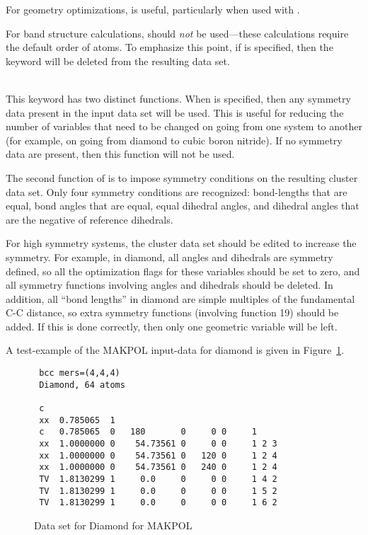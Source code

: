 \begin{description}
For geometry optimizations,  is useful, particularly when used with 
.  

For band structure calculations,  should {\em not} be used---these
calculations require the default order of atoms.  To emphasize this point, if
 is specified, then the keyword  will be deleted from the
resulting data set.

\item[\comp{SYMMETRY}]~\\ 
This keyword has two distinct functions.  When  is specified,
then any symmetry data present in the input data set will be used.  This is
useful for reducing the number of variables that need to be changed on going
from one system to another (for example, on going from diamond to cubic boron
nitride). If no symmetry data are present, then this function will not be used.

The second function of  is to impose symmetry conditions on the
resulting cluster data set.  Only four symmetry conditions are recognized: 
bond-lengths that are equal, bond angles that are equal, equal dihedral angles,
and dihedral angles that are the negative of reference dihedrals.

For high symmetry systems, the cluster data set should be edited to increase
the symmetry.  For example, in diamond, all angles and dihedrals are symmetry
defined, so all the optimization flags for these variables should be set to
zero, and all symmetry functions involving angles and dihedrals should be
deleted. In addition, all ``bond lengths'' in diamond are simple multiples of
the fundamental C-C distance, so extra symmetry functions (involving function
19) should be added.  If this is done correctly, then only one geometric
variable will be left.
\end{description}

A test-example of the MAKPOL input-data for diamond is given in
Figure~\ref{makpolc}.
\begin{figure}
\begin{makeimage}
\end{makeimage}
\begin{verbatim}
 bcc mers=(4,4,4)
 Diamond, 64 atoms

 c
 xx  0.785065  1
 c   0.785065  0   180       0     0 0     1
 xx  1.0000000 0    54.73561 0     0 0     1 2 3
 xx  1.0000000 0    54.73561 0   120 0     1 2 4
 xx  1.0000000 0    54.73561 0   240 0     1 2 4
 TV  1.8130299 1     0.0     0     0 0     1 4 2
 TV  1.8130299 1     0.0     0     0 0     1 5 2
 TV  1.8130299 1     0.0     0     0 0     1 6 2
\end{verbatim}
\caption{\label{makpolc} Data set for Diamond for MAKPOL}
\end{figure}
